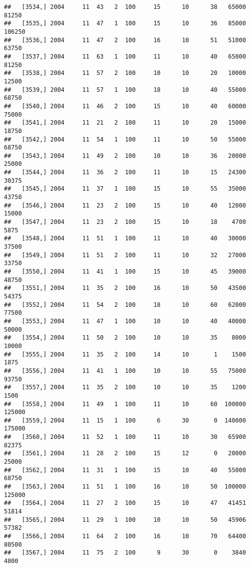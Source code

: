 \documentclass{article}\usepackage[]{graphicx}\usepackage[]{color}
\makeatletter
\newenvironment{kframe}{%
 \def\at@end@of@kframe{}%
 \ifinner\ifhmode%
  \def\at@end@of@kframe{\end{minipage}}%
  \begin{minipage}{\columnwidth}%
 \fi\fi%
 \def\FrameCommand##1{\hskip\@totalleftmargin \hskip-\fboxsep
 \colorbox{shadecolor}{##1}\hskip-\fboxsep
     \hskip-\linewidth \hskip-\@totalleftmargin \hskip\columnwidth}%
 \MakeFramed {\advance\hsize-\width
   \@totalleftmargin\z@ \linewidth\hsize
   \@setminipage}}%
 {\par\unskip\endMakeFramed%
 \at@end@of@kframe}
\newenvironment{knitrout}{}{} %
\makeatother
\begin{document}
\begin{knitrout}
\begin{kframe}
\begin{verbatim}
##   [3534,] 2004     11  43   2  100     15      10      38   65000   81250
##   [3535,] 2004     11  47   1  100     15      10      36   85000  106250
##   [3536,] 2004     11  47   2  100     16      10      51   51000   63750
##   [3537,] 2004     11  63   1  100     11      10      40   65000   81250
##   [3538,] 2004     11  57   2  100     10      10      20   10000   12500
##   [3539,] 2004     11  57   1  100     18      10      40   55000   68750
##   [3540,] 2004     11  46   2  100     15      10      40   60000   75000
##   [3541,] 2004     11  21   2  100     11      10      20   15000   18750
##   [3542,] 2004     11  54   1  100     11      10      50   55000   68750
##   [3543,] 2004     11  49   2  100     10      10      36   20000   25000
##   [3544,] 2004     11  36   2  100     11      10      15   24300   30375
##   [3545,] 2004     11  37   1  100     15      10      55   35000   43750
##   [3546,] 2004     11  23   2  100     15      10      40   12000   15000
##   [3547,] 2004     11  23   2  100     15      10      18    4700    5875
##   [3548,] 2004     11  51   1  100     11      10      40   30000   37500
##   [3549,] 2004     11  51   2  100     11      10      32   27000   33750
##   [3550,] 2004     11  41   1  100     15      10      45   39000   48750
##   [3551,] 2004     11  35   2  100     16      10      50   43500   54375
##   [3552,] 2004     11  54   2  100     18      10      60   62000   77500
##   [3553,] 2004     11  47   1  100     10      10      40   40000   50000
##   [3554,] 2004     11  50   2  100     10      10      35    8000   10000
##   [3555,] 2004     11  35   2  100     14      10       1    1500    1875
##   [3556,] 2004     11  41   1  100     10      10      55   75000   93750
##   [3557,] 2004     11  35   2  100     10      10      35    1200    1500
##   [3558,] 2004     11  49   1  100     11      10      60  100000  125000
##   [3559,] 2004     11  15   1  100      6      30       0  140000  175000
##   [3560,] 2004     11  52   1  100     11      10      30   65900   82375
##   [3561,] 2004     11  28   2  100     15      12       0   20000   25000
##   [3562,] 2004     11  31   1  100     15      10      40   55000   68750
##   [3563,] 2004     11  51   1  100     16      10      50  100000  125000
##   [3564,] 2004     11  27   2  100     15      10      47   41451   51814
##   [3565,] 2004     11  29   1  100     10      10      50   45906   57382
##   [3566,] 2004     11  64   2  100     16      10      70   64400   80500
##   [3567,] 2004     11  75   2  100      9      30       0    3840    4800

\end{verbatim}
\end{kframe}
\end{knitrout}
\end{document}
